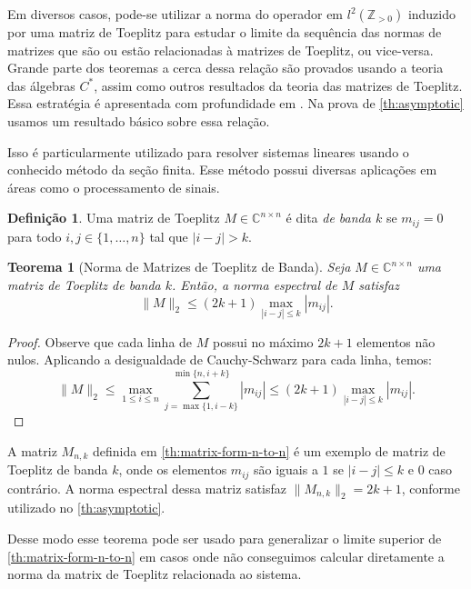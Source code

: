 \documentclass[a4paper,12pt]{article}
\newtheorem*{theorem*}{Teorema}
\theoremstyle{definition}
\newtheorem*{definition*}{Definição}
\begin{document}
Em diversos casos, pode-se utilizar a norma do operador em $l^2(\mathbb{Z}_{> 0})$ induzido por uma matriz de Toeplitz para estudar o limite da sequência das normas de matrizes que são ou estão relacionadas à matrizes de Toeplitz, ou vice-versa. Grande parte dos teoremas a cerca dessa relação são provados usando a teoria das álgebras $C^\ast$, assim como outros resultados da teoria das matrizes de Toeplitz. Essa estratégia é apresentada com profundidade em \cite{bottcher}. Na prova de \ref{th:asymptotic} usamos um resultado básico sobre essa relação.

Isso é particularmente utilizado para resolver sistemas lineares usando o conhecido método da seção finita. Esse método possui diversas aplicações em áreas como o processamento de sinais.

\begin{definition*}
  Uma matriz de Toeplitz \( M \in \mathbb{C}^{n \times n} \) é dita \textit{de banda \( k \)} se \( m_{ij} = 0 \) para todo \( i, j \in \{1, \dots, n\} \) tal que \( |i - j| > k \).
\end{definition*}

\begin{theorem*}[Norma de Matrizes de Toeplitz de Banda]
  Seja \( M \in \mathbb{C}^{n \times n} \) uma matriz de Toeplitz de banda \( k \). Então, a norma espectral de \( M \) satisfaz
  \[
    \| M \|_2 \le (2k + 1) \max_{|i - j| \le k} |m_{ij}|.
  \]
\end{theorem*}

\begin{proof}
  Observe que cada linha de \( M \) possui no máximo \( 2k + 1 \) elementos não nulos. Aplicando a desigualdade de Cauchy-Schwarz para cada linha, temos:
  \[
    \| M \|_2 \le \max_{1 \le i \le n} \sum_{j = \max\{1, i - k\}}^{\min\{n, i + k\}} |m_{ij}| \le (2k + 1) \max_{|i - j| \le k} |m_{ij}|.
  \]
\end{proof}

A matriz $ M_{n,k} $ definida em \ref{th:matrix-form-n-to-n} é um exemplo de matriz de Toeplitz de banda $ k $, onde os elementos $ m_{ij} $ são iguais a $ 1 $ se $ |i - j| \le k $ e $ 0 $ caso contrário. A norma espectral dessa matriz satisfaz $ \| M_{n,k} \|_2 = 2k + 1 $, conforme utilizado no \ref{th:asymptotic}.

Desse modo esse teorema pode ser usado para generalizar o limite superior de \ref{th:matrix-form-n-to-n} em casos onde não conseguimos calcular diretamente a norma da matrix de Toeplitz relacionada ao sistema.
\end{document}
